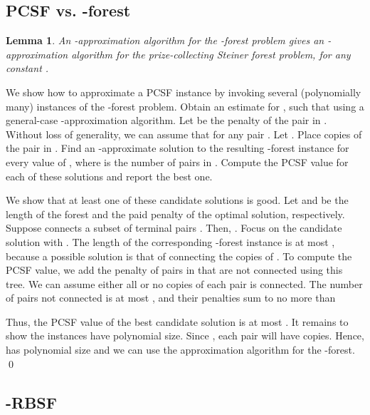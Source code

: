 \documentclass[extras,11pt]{article} \usepackage{fullpage}
\theoremstyle{mytheorem}
\newtheorem{lemma}[theorem]{Lemma}
\renewenvironment{proof}{\par\noindent{\bf Proof.}\hspace{0.5em}}
    {\hfill\qed\vspace{1ex}}
\newcommand{\prob}[1]{\textit{#1}}
\begin{document}
\subsection{PCSF vs. -forest}
\begin{lemma}\label{lem:kfor>pcsf}
 An -approximation algorithm for the \prob{-forest} problem
 gives an -approximation algorithm for the \prob{prize-collecting Steiner forest} problem, for any constant .
\end{lemma}
\begin{proof}
 We show how to approximate a PCSF instance  by
 invoking several (polynomially many) instances  of the -forest problem.
 Obtain an estimate  for  ,
 such that  using a general-case -approximation algorithm.
 Let  be the penalty of the pair  in .
 Without loss of generality, we can assume that  for any pair .
Let .
 Place  copies  of  the pair  in . Find an -approximate solution to the resulting -forest instance
 for every value of , where  is the number of pairs in .
 Compute the PCSF value for each of these solutions and report the best one.

 We show that at least one of these candidate solutions is good.
 Let  and  be the length of the forest and the paid penalty
 of the optimal solution, respectively.
 Suppose  connects a subset of terminal pairs .
 Then, .
 Focus on the candidate solution with .
 The length of the corresponding -forest instance is
 at most , because a possible solution is that of connecting the copies of  .
 To compute the PCSF value, we add the penalty of pairs in  that are not connected using this tree.
 We can assume either all or no copies of each pair is connected.
 The number of pairs not connected is at most ,
 and  their penalties sum to no more than

Thus, the PCSF value of the best candidate solution is at most .
 It remains to show the instances  have polynomial size.
 Since , each pair  will have  copies.
 Hence,  has polynomial size and we can use the approximation algorithm for the -forest.
\end{proof}











\iffalse

\subsection{-RBSF}\label{sec:krbsf}
\end{document}
